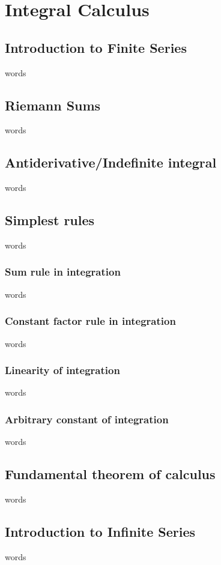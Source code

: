 \chapter{Integral Calculus}

\section{Introduction to Finite Series}
words


\section{Riemann Sums}
words

\section{Antiderivative/Indefinite integral}
words

\section{Simplest rules}
words

\subsection{Sum rule in integration}
words

\subsection{Constant factor rule in integration}
words

\subsection{Linearity of integration}
words

\subsection{Arbitrary constant of integration}
words


\section{Fundamental theorem of calculus}
words




\section{Introduction to Infinite Series}
words

